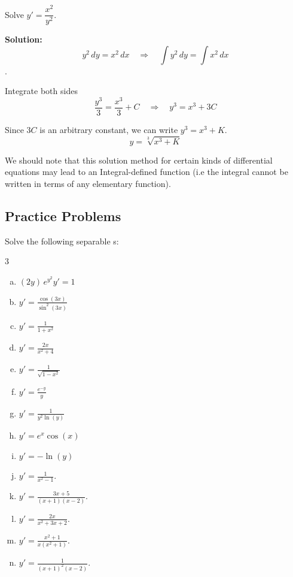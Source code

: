 \begin{example} Solve \(y' = \dfrac{x^2}{y^2}\).

    \textbf{Solution:}
    \[
    y^2 \, dy = x^2 \, dx \quad \Rightarrow \quad \int y^2 \, dy = \int x^2 \, dx
    \].
    
    Integrate both sides
    \[
    \frac{y^3}{3} = \frac{x^3}{3} + C \quad \Rightarrow \quad y^3 = x^3 + 3C
    \] 
    
    Since $3C$ is an arbitrary constant, we can write $y^3 = x^3 + K$.
    $$ y = \sqrt[3]{x^3 + K} $$

\end{example}


\begin{highlight}
    We should note that this solution method for certain kinds of differential
    equations may lead to an Integral-defined function (i.e the integral cannot 
    be written in terms of any elementary function).
\end{highlight}


\subsection*{Practice Problems}
\begin{question}
  Solve the following separable \ode{}s:
  \begin{multicols}{3}
  \begin{enumerate}[(a)]
    \item $\displaystyle (2y)\, e^{y^2}y' = 1$
    \item $\displaystyle y' =\frac{\cos(3x)}{\sin^2(3x)}$
    \item $\displaystyle y' = \frac{1}{1+x^2}$
    \item $\displaystyle y' = \frac{2x}{x^2+4}$
    \item $\displaystyle y' = \frac{1}{\sqrt{1-x^2}}$
    \item $\displaystyle y' = \frac{e^{-y}}{y}$
    \item $\displaystyle y' = \frac{1}{y^2 \ln(y)}$
    \item $\displaystyle y' = e^x \cos(x)$
    \item $\displaystyle y' = -\ln(y)$
    \item $\displaystyle y' = \frac{1}{x^2-1}$.
    \item $\displaystyle y' = \frac{3x+5}{(x+1)(x-2)}$.
    \item $\displaystyle y' = \frac{2x}{x^2+3x+2}$.
    \item $\displaystyle y' = \frac{x^2+1}{x(x^2+1)}$.
    \item $\displaystyle y' = \frac{1}{(x+1)^2(x-2)}$.
\end{enumerate}
\end{multicols}
\end{question}

